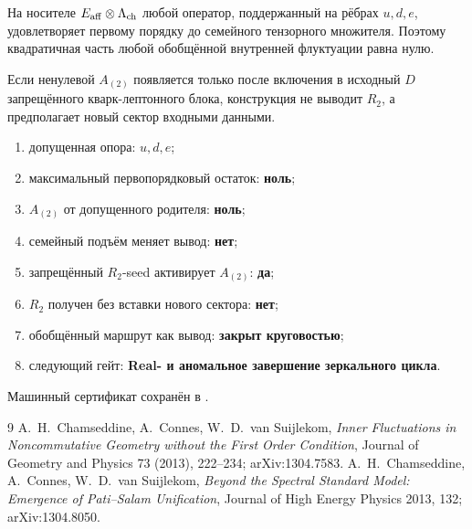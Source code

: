 \begin{theorem}
На носителе $E_{\rm aff}\otimes\Lambda_{\rm ch}$ любой оператор,
поддержанный на рёбрах $u,d,e$, удовлетворяет первому порядку до семейного
тензорного множителя. Поэтому квадратичная часть любой обобщённой внутренней
флуктуации равна нулю.
\end{theorem}

\begin{nogocriterion}
Если ненулевой $A_{(2)}$ появляется только после включения в исходный $D$
запрещённого кварк-лептонного блока, конструкция не выводит $R_2$, а
предполагает новый сектор входными данными.
\end{nogocriterion}

\begin{protocol}
\begin{enumerate}
 \item допущенная опора: \textbf{$u,d,e$};
 \item максимальный первопорядковый остаток: \textbf{ноль};
 \item $A_{(2)}$ от допущенного родителя: \textbf{ноль};
 \item семейный подъём меняет вывод: \textbf{нет};
 \item запрещённый $R_2$-seed активирует $A_{(2)}$: \textbf{да};
 \item $R_2$ получен без вставки нового сектора: \textbf{нет};
 \item обобщённый маршрут как вывод: \textbf{закрыт круговостью};
 \item следующий гейт: \textbf{Real- и аномальное завершение зеркального
 цикла}.
\end{enumerate}
\end{protocol}

Машинный сертификат сохранён в
.

\begin{thebibliography}{9}
A.~H.~Chamseddine, A.~Connes, W.~D.~van Suijlekom,
\emph{Inner Fluctuations in Noncommutative Geometry without the First Order Condition},
Journal of Geometry and Physics 73 (2013), 222--234; arXiv:1304.7583.
A.~H.~Chamseddine, A.~Connes, W.~D.~van Suijlekom,
\emph{Beyond the Spectral Standard Model: Emergence of Pati--Salam Unification},
Journal of High Energy Physics 2013, 132; arXiv:1304.8050.
\end{thebibliography}
